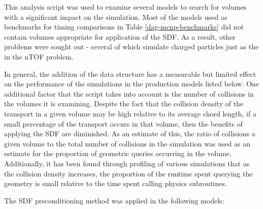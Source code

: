 This analysis script was used to examine several models to search for volumes
with a significant impact on the simulation. Most of the models used as
benchmarks for timing comparisons in Table \ref{dag-mcnp-benchmarks} did not
contain volumes appropriate for application of the SDF. As a result, other
problems were sought out - several of which simulate charged particles just as
the in the nTOF problem.

In general, the addition of the data structure has a measurable but limited
effect on the performance of the simulations in the production models listed
below. One additional factor that the script takes into account is the number of
collisions in the volumes it is examining. Despite the fact that the collision
density of the transport in a given volume may be high relative to its average
chord length, if a small percentage of the transport occurs in that volume, then
the benefits of applying the SDF are diminished. As an estimate of this, the
ratio of collisions a given volume to the total number of collisions in the
simulation was used as an estimate for the proportion of geometric queries
occurring in the volume.  Additionally, it has been found through profiling of
various simulations that as the collision density increases, the proportion of the
runtime spent querying the geometry is small relative to the time spent calling
physics subroutines.

\noindent
The SDF preconditioning method was applied in the following models:






